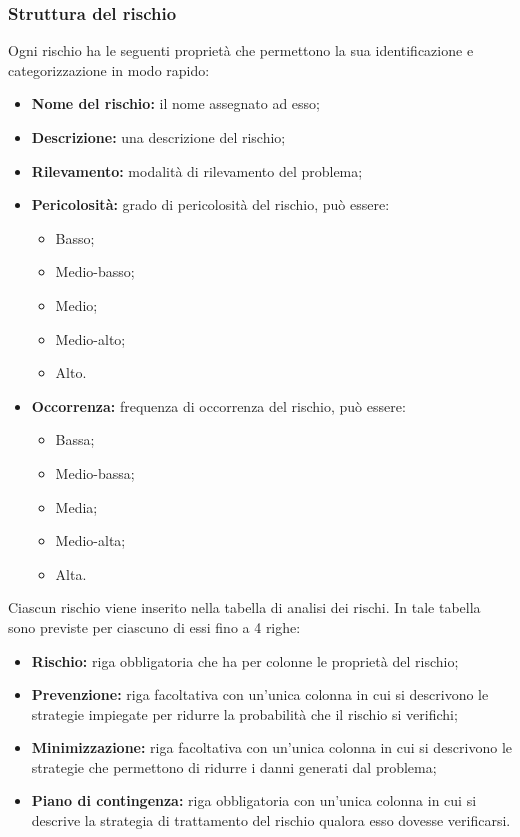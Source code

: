\subsubsection{Struttura del rischio}
Ogni rischio ha le seguenti proprietà che permettono la sua identificazione e categorizzazione in modo rapido:
\begin{itemize}
\item	\textbf{Nome del rischio: }il nome assegnato ad esso;
\item	\textbf{Descrizione: }una descrizione del rischio;
\item	\textbf{Rilevamento: }modalità di rilevamento del problema;
\item	\textbf{Pericolosità: }grado di pericolosità del rischio, può essere:
	\begin{itemize}
		\item Basso;
		\item Medio-basso;
		\item Medio;
		\item Medio-alto;
		\item Alto.
	\end{itemize}
\item	\textbf{Occorrenza: }frequenza di occorrenza del rischio, può essere:
\begin{itemize}
	\item Bassa;
	\item Medio-bassa;
	\item Media;
	\item Medio-alta;
	\item Alta.
\end{itemize}
\end{itemize}
Ciascun rischio viene inserito nella tabella di analisi dei rischi. In tale tabella sono previste per ciascuno di essi fino a 4 righe:
\begin{itemize}
	\item \textbf{Rischio: }riga obbligatoria che ha per colonne le proprietà del rischio;
	\item \textbf{Prevenzione: }riga facoltativa con un'unica colonna in cui si descrivono le strategie impiegate per ridurre la probabilità che il rischio si verifichi;
	\item \textbf{Minimizzazione: }riga facoltativa con un'unica colonna in cui si descrivono le strategie che permettono di ridurre i danni generati dal problema;
	\item \textbf{Piano di contingenza: }riga obbligatoria con un'unica colonna in cui si descrive la strategia di trattamento del rischio qualora esso dovesse verificarsi.
\end{itemize}

